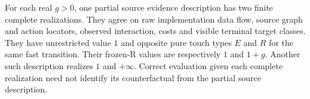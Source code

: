 \begin{theorem}\label{thm:t02}

For each real \(g>0\), one partial source evidence description has two finite complete realizations. They agree on raw implementation data flow, source graph and action locators, observed interaction, costs and visible terminal target classes. They have unrestricted value \(1\) and opposite pure touch types \(E\) and \(R\) for the same fast transition. Their frozen-R values are respectively \(1\) and \(1+g\). Another such description realizes \(1\) and \(+\infty\). Correct evaluation given each complete realization need not identify its counterfactual from the partial source description.

\end{theorem}

